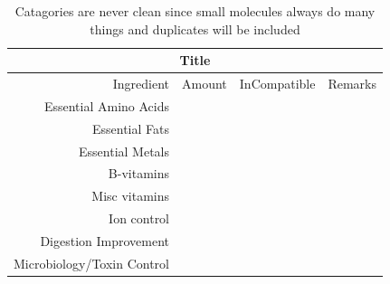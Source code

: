  \ifdefined\mjmstandalone%
%
\else%
\newcommand{\mjmstandalone}[1]{%
  \ifdefined\MJMTEXFRAG%
   #1%
  \fi%
}
  \fi%


\begin{table}[H] \centering
\begin{tabular}{|r|r|c|r|}
\hline
\multicolumn{4}{c}{Title}\\
\hline
Ingredient & Amount & InCompatible &  Remarks \\
\hline
Essential Amino Acids &&& \\
Essential Fats &&& \\
Essential Metals &&& \\
B-vitamins  &&& \\
Misc vitamins  &&& \\
Ion control  &&& \\
Digestion Improvement  &&& \\
Microbiology/Toxin Control   &&& \\

\hline
\end{tabular}
\caption{ Catagories are never clean since small molecules always do many things and duplicates will be included }
\end{table}
